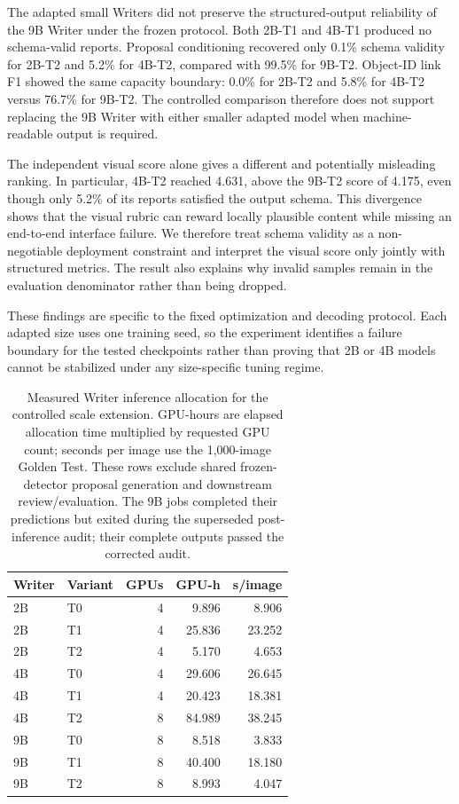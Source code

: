 The adapted small Writers did not preserve the structured-output reliability
of the 9B Writer under the frozen protocol. Both 2B-T1 and 4B-T1 produced no
schema-valid reports. Proposal conditioning recovered only 0.1\% schema
validity for 2B-T2 and 5.2\% for 4B-T2, compared with 99.5\% for 9B-T2.
Object-ID link F1 showed the same capacity boundary: 0.0\% for 2B-T2 and 5.8\%
for 4B-T2 versus 76.7\% for 9B-T2. The controlled comparison therefore does
not support replacing the 9B Writer with either smaller adapted model when
machine-readable output is required.

The independent visual score alone gives a different and potentially
misleading ranking. In particular, 4B-T2 reached 4.631, above the 9B-T2 score
of 4.175, even though only 5.2\% of its reports satisfied the output schema.
This divergence shows that the visual rubric can reward locally plausible
content while missing an end-to-end interface failure. We therefore treat
schema validity as a non-negotiable deployment constraint and interpret the
visual score only jointly with structured metrics. The result also explains
why invalid samples remain in the evaluation denominator rather than being
dropped.

These findings are specific to the fixed optimization and decoding protocol.
Each adapted size uses one training seed, so the experiment identifies a
failure boundary for the tested checkpoints rather than proving that 2B or 4B
models cannot be stabilized under any size-specific tuning regime.

\begin{table}[H]
\centering
\small
\setlength{\tabcolsep}{4pt}
\begin{tabular}{llrrr}
\toprule
Writer & Variant & GPUs & GPU-h & s/image \\
\midrule
2B & T0 & 4 & 9.896 & 8.906 \\
2B & T1 & 4 & 25.836 & 23.252 \\
2B & T2 & 4 & 5.170 & 4.653 \\
4B & T0 & 4 & 29.606 & 26.645 \\
4B & T1 & 4 & 20.423 & 18.381 \\
4B & T2 & 8 & 84.989 & 38.245 \\
9B & T0 & 8 & 8.518 & 3.833 \\
9B & T1 & 8 & 40.400 & 18.180 \\
9B & T2 & 8 & 8.993 & 4.047 \\
\bottomrule
\end{tabular}
\caption{Measured Writer inference allocation for the controlled scale
extension. GPU-hours are elapsed allocation time multiplied by requested GPU
count; seconds per image use the 1,000-image Golden Test. These rows exclude
shared frozen-detector proposal generation and downstream review/evaluation.
The 9B jobs completed their predictions but exited during the superseded
post-inference audit; their complete outputs passed the corrected audit.}
\label{tab:small-writer-efficiency}
\end{table}

